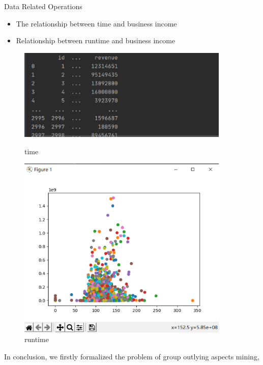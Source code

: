 \documentclass[
 size=14pt,
 paper=smartboard,  %
 mode=present, 		%
 display=slides, 	%
 style=tuliplab,  	%
 pauseslide,
 fleqn,leqno]{powerdot}
\begin{document}
\begin{slide}[toc=,bm=]{ Data Related Operations}
  \begin{itemize}
  \item The relationship between time and business income
  
  \item Relationship between runtime and business income
  

  
  \end{itemize}
  \begin{figure}[htbp]
    \centering
    \begin{minipage}[t]{0.48\textwidth}
      \centering
      \includegraphics[width=0.9\textwidth]{logos/4.eps}
      \vspace{0.4em}
      \caption{time}
    \end{minipage}
    \begin{minipage}[t]{0.48\textwidth}
      \centering
      \includegraphics[width=0.9\textwidth]{logos/22.eps}
      \vspace{0.4em}
      \caption{runtime}
    \end{minipage}
  \end{figure}
  \begin{note}
  In conclusion,
  we firstly formalized the problem of
  group outlying aspects mining,
  

\end{note}
\end{slide}
\end{document}
